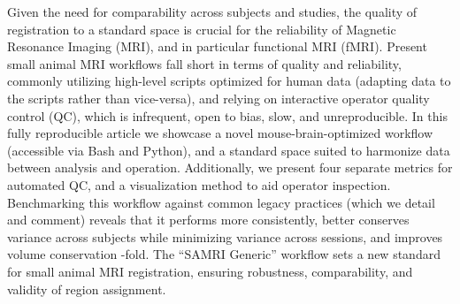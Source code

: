 Given the need for comparability across subjects and studies, the quality of registration to a standard space is crucial for the reliability of Magnetic Resonance Imaging (MRI), and in particular functional MRI (fMRI).
Present small animal MRI workflows fall short in terms of quality and reliability, commonly utilizing high-level scripts optimized for human data (adapting data to the scripts rather than vice-versa), and relying on interactive operator quality control (QC), which is infrequent, open to bias, slow, and unreproducible.
In this fully reproducible article we showcase a novel mouse-brain-optimized workflow (accessible via Bash and Python), and a standard space suited to harmonize data between analysis and operation.
Additionally, we present four separate metrics for automated QC, and a visualization method to aid operator inspection.
Benchmarking this workflow against common legacy practices (which we detail and comment) reveals that it performs more consistently, better conserves variance across subjects while minimizing variance across sessions, and improves volume conservation
-fold.
The “SAMRI Generic” workflow sets a new standard for small animal MRI registration, ensuring robustness, comparability, and validity of region assignment.
